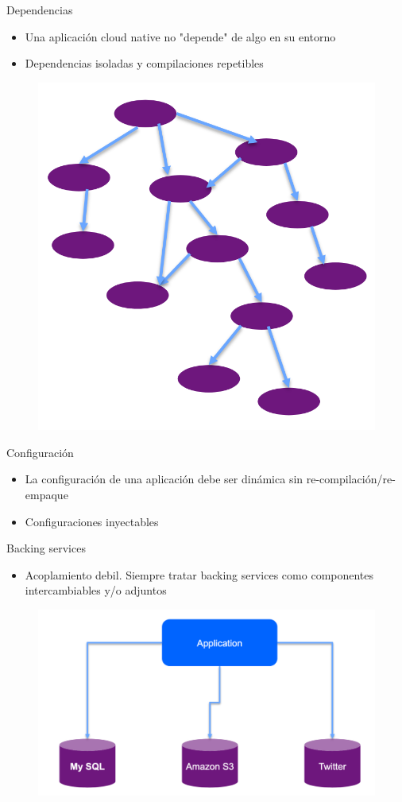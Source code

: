 \documentclass{beamer}
\begin{document}
\begin{frame}{Dependencias}
\begin{itemize}
	\item Una aplicación cloud native no "depende" de algo en su entorno
	\item Dependencias isoladas y compilaciones repetibles
\end{itemize}

\begin{figure}
	\centering
	\includegraphics[width=0.5\linewidth]{Images/maven}
\end{figure}
\end{frame}


\begin{frame}{Configuración}
\begin{itemize}
	\item La configuración de una aplicación debe ser dinámica sin re-compilación/re-empaque 
	\item Configuraciones inyectables
\end{itemize}
\end{frame}


\begin{frame}{Backing services}
\begin{itemize}
	\item Acoplamiento debil. Siempre tratar backing services como componentes intercambiables y/o adjuntos
\end{itemize}

\begin{figure}
	\centering
	\includegraphics[width=0.5\linewidth]{Images/backing}
\end{figure}
\end{frame}
\end{document}
